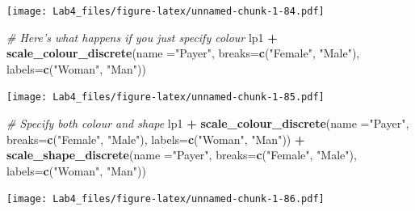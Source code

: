\documentclass[]{article}
\newenvironment{Shaded}{\begin{snugshade}}{\end{snugshade}}
\newcommand{\KeywordTok}[1]{\textcolor[rgb]{0.13,0.29,0.53}{\textbf{#1}}}
\newcommand{\DataTypeTok}[1]{\textcolor[rgb]{0.13,0.29,0.53}{#1}}
\newcommand{\StringTok}[1]{\textcolor[rgb]{0.31,0.60,0.02}{#1}}
\newcommand{\CommentTok}[1]{\textcolor[rgb]{0.56,0.35,0.01}{\textit{#1}}}
\newcommand{\OperatorTok}[1]{\textcolor[rgb]{0.81,0.36,0.00}{\textbf{#1}}}
\newcommand{\NormalTok}[1]{#1}
\begin{document}
\texttt{[image: Lab4\_files/figure-latex/unnamed-chunk-1-84.pdf]}

\begin{Shaded}
\begin{Highlighting}[]
\CommentTok{# Here's what happens if you just specify colour}
\NormalTok{lp1 }\OperatorTok{+}\StringTok{ }\KeywordTok{scale_colour_discrete}\NormalTok{(}\DataTypeTok{name  =}\StringTok{"Payer"}\NormalTok{,}
                            \DataTypeTok{breaks=}\KeywordTok{c}\NormalTok{(}\StringTok{"Female"}\NormalTok{, }\StringTok{"Male"}\NormalTok{),}
                            \DataTypeTok{labels=}\KeywordTok{c}\NormalTok{(}\StringTok{"Woman"}\NormalTok{, }\StringTok{"Man"}\NormalTok{))}
\end{Highlighting}
\end{Shaded}

\texttt{[image: Lab4\_files/figure-latex/unnamed-chunk-1-85.pdf]}

\begin{Shaded}
\begin{Highlighting}[]
\CommentTok{# Specify both colour and shape}
\NormalTok{lp1 }\OperatorTok{+}\StringTok{ }\KeywordTok{scale_colour_discrete}\NormalTok{(}\DataTypeTok{name  =}\StringTok{"Payer"}\NormalTok{,}
                            \DataTypeTok{breaks=}\KeywordTok{c}\NormalTok{(}\StringTok{"Female"}\NormalTok{, }\StringTok{"Male"}\NormalTok{),}
                            \DataTypeTok{labels=}\KeywordTok{c}\NormalTok{(}\StringTok{"Woman"}\NormalTok{, }\StringTok{"Man"}\NormalTok{)) }\OperatorTok{+}
\StringTok{      }\KeywordTok{scale_shape_discrete}\NormalTok{(}\DataTypeTok{name  =}\StringTok{"Payer"}\NormalTok{,}
                           \DataTypeTok{breaks=}\KeywordTok{c}\NormalTok{(}\StringTok{"Female"}\NormalTok{, }\StringTok{"Male"}\NormalTok{),}
                           \DataTypeTok{labels=}\KeywordTok{c}\NormalTok{(}\StringTok{"Woman"}\NormalTok{, }\StringTok{"Man"}\NormalTok{))}
\end{Highlighting}
\end{Shaded}

\texttt{[image: Lab4\_files/figure-latex/unnamed-chunk-1-86.pdf]}
\end{document}
